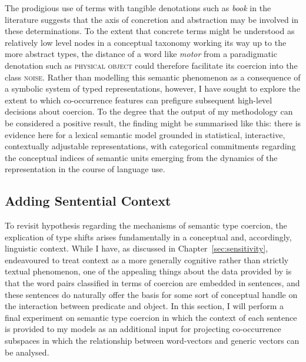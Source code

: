 The prodigious use of terms with tangible denotations such as \emph{book} in the literature suggests that the axis of concretion and abstraction may be involved in these determinations.  To the extent that concrete terms might be understood as relatively low level nodes in a conceptual taxonomy working its way up to the more abstract types, the distance of a word like \emph{motor} from a paradigmatic denotation such as \textsc{physical object} could therefore facilitate its coercion into the class \textsc{noise}.  Rather than modelling this semantic phenomenon as a consequence of a symbolic system of typed representations, however, I have sought to explore the extent to which co-occurrence features can prefigure subsequent high-level decisions about coercion.  To the degree that the output of my methodology can be considered a positive result, the finding might be summarised like this: there is evidence here for a lexical semantic model grounded in statistical, interactive, contextually adjustable representations, with categorical commitments regarding the conceptual indices of semantic units emerging from the dynamics of the representation in the course of language use.

\subsection{Adding Sentential Context}
To revisit  hypothesis regarding the mechanisms of semantic type coercion, the explication of type shifts arises fundamentally in a conceptual and, accordingly, linguistic context.  While I have, as discussed in Chapter~\ref{sec:sensitivity}, endeavoured to treat context as a more generally cognitive rather than strictly textual phenomenon, one of the appealing things about the data provided by \cite{PustejovskyEA2010} is that the word pairs classified in terms of coercion are embedded in sentences, and these sentences do naturally offer the basis for some sort of conceptual handle on the interaction between predicate and object.  In this section, I will perform a final experiment on semantic type coercion in which the context of each sentence is provided to my models as an additional input for projecting co-occurrence subspaces in which the relationship between word-vectors and generic vectors can be analysed.

